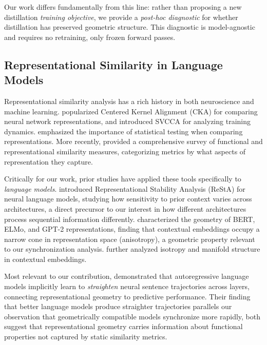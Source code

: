 \documentclass[10pt]{article} %
\theoremstyle{plain}
\theoremstyle{definition}
\theoremstyle{remark}
\begin{document}
Our work differs fundamentally from this line: rather than proposing a new distillation \textit{training objective}, we provide a \textit{post-hoc diagnostic} for whether distillation has preserved geometric structure. This diagnostic is model-agnostic and requires no retraining, only frozen forward passes.

\subsection{Representational Similarity in Language Models}

Representational similarity analysis has a rich history in both neuroscience and machine learning. \citet{kornblith2019similarity} popularized Centered Kernel Alignment (CKA) for comparing neural network representations, and \citet{raghu2017svcca} introduced SVCCA for analyzing training dynamics. \citet{ding2021grounding} emphasized the importance of statistical testing when comparing representations. More recently, \citet{klabunde2023similarity} provided a comprehensive survey of functional and representational similarity measures, categorizing metrics by what aspects of representation they capture.

Critically for our work, prior studies have applied these tools specifically to \textit{language models}. \citet{abnar2019blackbox} introduced Representational Stability Analysis (ReStA) for neural language models, studying how sensitivity to prior context varies across architectures, a direct precursor to our interest in how different architectures process sequential information differently. \citet{ethayarajh2019contextual} characterized the geometry of BERT, ELMo, and GPT-2 representations, finding that contextual embeddings occupy a narrow cone in representation space (anisotropy), a geometric property relevant to our synchronization analysis. \citet{cai2021isotropy} further analyzed isotropy and manifold structure in contextual embeddings.

Most relevant to our contribution, \citet{hosseini2023straightening} demonstrated that autoregressive language models implicitly learn to \textit{straighten} neural sentence trajectories across layers, connecting representational geometry to predictive performance. Their finding that better language models produce straighter trajectories parallels our observation that geometrically compatible models synchronize more rapidly, both suggest that representational geometry carries information about functional properties not captured by static similarity metrics.
\end{document}
